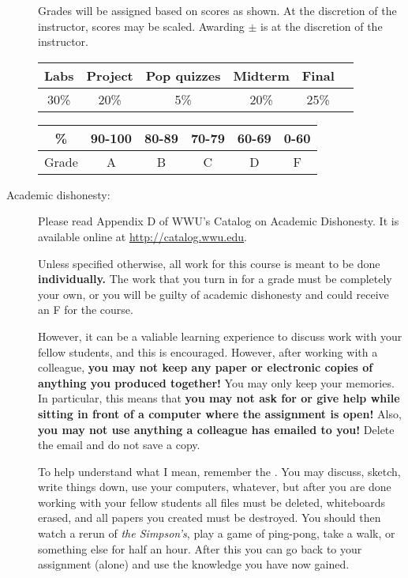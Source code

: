 \documentclass{article}
\begin{document}
\begin{description}
Grades will be assigned based on scores as shown.  At the discretion
of the instructor, scores may be scaled.  Awarding $\pm$ is at the
discretion of the instructor.

\begin{tabular}{|c|c|c|c|c|c|}\hline
Labs & Project & Pop quizzes & Midterm & Final \\\hline
30\% & 20\% & 5\% & 20\% & 25\% \\\hline
\end{tabular}

\begin{tabular}{|c|c|c|c|c|c|}\hline
\% & 90-100 & 80-89 & 70-79 & 60-69 & 0-60\\\hline
Grade & A & B & C & D & F\\\hline
\end{tabular}


\item[Academic dishonesty:] Please read Appendix D of WWU's Catalog on
  Academic Dishonesty.  It is available online at
  \url{http://catalog.wwu.edu}.

  Unless specified otherwise, all work for this course is meant to
  be done {\bf individually.}  The work that you turn in for a grade
  must be completely your own, or you will be guilty of academic
  dishonesty and could receive an F for the course.

  However, it can be a valiable learning experience to discuss
  work with your fellow students, and this is encouraged.
  However, after working with a colleague, {\bf you may not keep any
    paper or electronic copies of anything you produced together!}
  You may only keep your memories.  In particular, this means that
  {\bf you may not ask for or give help while sitting in front of a
    computer where the assignment is open!}  Also, {\bf you may not
    use anything a colleague has emailed to you!}  Delete the email
  and do not save a copy.

  To help understand what I mean, remember the {}.  You may discuss, sketch, write things down, use
  your computers, whatever, but after you are done working with your
  fellow students all files must be deleted, whiteboards erased, and
  all papers you created must be destroyed.  You should then watch a
  rerun of {\em the Simpson's}, play a game of ping-pong, take a walk,
  or something else for half an hour. After this you can go back to
  your assignment (alone) and use the knowledge you have now gained.


\end{description}
\end{document}
